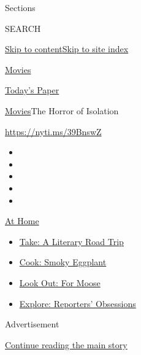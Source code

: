 Sections

SEARCH

\protect\hyperlink{site-content}{Skip to
content}\protect\hyperlink{site-index}{Skip to site index}

\href{https://www.nytimes.com/section/movies}{Movies}

\href{https://myaccount.nytimes.com/auth/login?response_type=cookie\&client_id=vi}{}

\href{https://www.nytimes.com/section/todayspaper}{Today's Paper}

\href{/section/movies}{Movies}\textbar{}The Horror of Isolation

\url{https://nyti.ms/39BnswZ}

\begin{itemize}
\item
\item
\item
\item
\item
\end{itemize}

\href{https://www.nytimes.com/spotlight/at-home?action=click\&pgtype=Article\&state=default\&region=TOP_BANNER\&context=at_home_menu}{At
Home}

\begin{itemize}
\tightlist
\item
  \href{https://www.nytimes.com/2020/07/28/books/time-for-a-literary-road-trip.html?action=click\&pgtype=Article\&state=default\&region=TOP_BANNER\&context=at_home_menu}{Take:
  A Literary Road Trip}
\item
  \href{https://www.nytimes.com/2020/07/29/magazine/bored-with-your-home-cooking-some-smoky-eggplant-will-fix-that.html?action=click\&pgtype=Article\&state=default\&region=TOP_BANNER\&context=at_home_menu}{Cook:
  Smoky Eggplant}
\item
  \href{https://www.nytimes.com/2020/07/27/travel/moose-michigan-isle-royale.html?action=click\&pgtype=Article\&state=default\&region=TOP_BANNER\&context=at_home_menu}{Look
  Out: For Moose}
\item
  \href{https://www.nytimes.com/interactive/2020/at-home/even-more-reporters-editors-diaries-lists-recommendations.html?action=click\&pgtype=Article\&state=default\&region=TOP_BANNER\&context=at_home_menu}{Explore:
  Reporters' Obsessions}
\end{itemize}

Advertisement

\protect\hyperlink{after-top}{Continue reading the main story}

